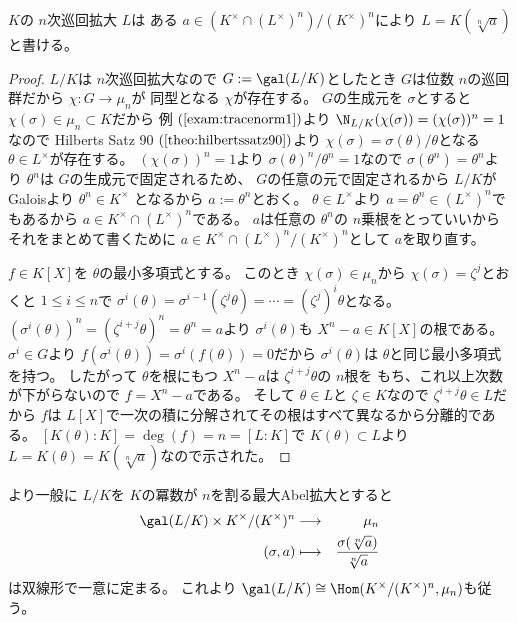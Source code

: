 \documentclass[../master_galois_theory]{subfiles}
\begin{document}
\begin{theo}
  $K$の $n$次巡回拡大 $L$は
  ある $a \in (K^\times \cap (L^\times)^n)/(K^\times)^n$により
  $L = K(\sqrt[n]{a})$と書ける。
\end{theo}

\begin{proof}
  $L/K$は $n$次巡回拡大なので $G := \gal(L/K)$としたとき
  $G$は位数 $n$の巡回群だから $\chi : G \longrightarrow \mu_n$が
  同型となる $\chi$が存在する。
  $G$の生成元を $\sigma$とすると $\chi(\sigma) \in \mu_n \subset K$だから
  例 $(\mathrm{\ref{exam:tracenorm1}})$より
  $\N_{L/K}(\chi(\sigma)) = (\chi(\sigma))^n = 1$なので
  \rm{Hilberts Satz 90} $(\mathrm{\ref{theo:hilbertssatz90}})$より
  $\chi(\sigma) = \sigma(\theta)/\theta$となる $\theta \in L^\times$が存在する。
  $(\chi(\sigma))^n = 1$より $\sigma(\theta)^n/\theta^n = 1$なので
  $\sigma(\theta^n) = \theta^n$より $\theta^n$は $G$の生成元で固定されるため、
  $G$の任意の元で固定されるから $L/K$が\rm{Galois}より $\theta^n \in K^\times$
  となるから $a := \theta^n$とおく。
  $\theta \in L^\times$より $a = \theta^n \in (L^\times)^n$でもあるから
  $a \in K^\times \cap (L^\times)^n$である。
  $a$は任意の $\theta^n$の $n$乗根をとっていいからそれをまとめて書くために
  $a \in K^\times \cap (L^\times)^n / (K^\times)^n$として $a$を取り直す。

  $f \in K[X]$を $\theta$の最小多項式とする。
  このとき $\chi(\sigma) \in \mu_n$から $\chi(\sigma) = \zeta^j$とおくと
  $1 \leq i \leq n$で
  $\sigma^i(\theta) = \sigma^{i-1}(\zeta^j \theta) = \cdots = (\zeta^j)^i \theta$となる。
  $(\sigma^i(\theta))^n = (\zeta^{i + j} \theta)^n = \theta^n = a$より
  $\sigma^i(\theta)$も $X^n - a \in K[X]$の根である。
  $\sigma^i \in G$より $f(\sigma^i(\theta)) = \sigma^i(f(\theta)) = 0$だから
  $\sigma^i(\theta)$は $\theta$と同じ最小多項式を持つ。
  したがって $\theta$を根にもつ $X^n - a$は $\zeta^{i + j} \theta$の $n$根を
  もち、これ以上次数が下がらないので $f = X^n - a$である。
  そして $\theta \in L$と $\zeta \in K$なので $\zeta^{i + j} \theta \in L$だから $f$は $L[X]$で一次の積に分解されてその根はすべて異なるから分離的である。
  $[K(\theta):K] = \deg(f) = n = [L:K]$で $K(\theta) \subset L$より
  $L = K(\theta) = K(\sqrt[n]{a})$なので示された。
\end{proof}

\begin{fact}
  より一般に $L/K$を $K$の冪数が $n$を割る最大\rm{Abel}拡大とすると
  \begin{eqnarray*}
    \gal(L/K) \times K^\times/(K^\times)^n & \longrightarrow & \mu_n \\
    (\sigma , a) & \longmapsto & \frac{\sigma(\sqrt[n]{a})}{\sqrt[n]{a}}
  \end{eqnarray*}
  は双線形で一意に定まる。
  これより
  $\gal(L/K) \cong \Hom(K^\times/(K^\times)^n , \mu_n)$も従う。
\end{fact}
\end{document}
